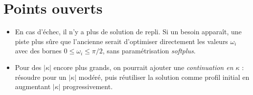 \documentclass[11pt,a4paper]{article}
\begin{document}
\section{Points ouverts}

\begin{itemize}
  \item En cas d'échec, il n'y a plus de solution de repli. Si un besoin
        apparaît, une piste plus sûre que l'ancienne serait d'optimiser
        directement les valeurs $\omega_i$ avec des bornes
        $0\le\omega_i\le\pi/2$, sans paramétrisation \emph{softplus}.
  \item Pour des $|\kappa|$ encore plus grands, on pourrait ajouter une
        \emph{continuation en $\kappa$} : résoudre pour un $|\kappa|$ modéré,
        puis réutiliser la solution comme profil initial en augmentant
        $|\kappa|$ progressivement.
\end{itemize}
\end{document}
